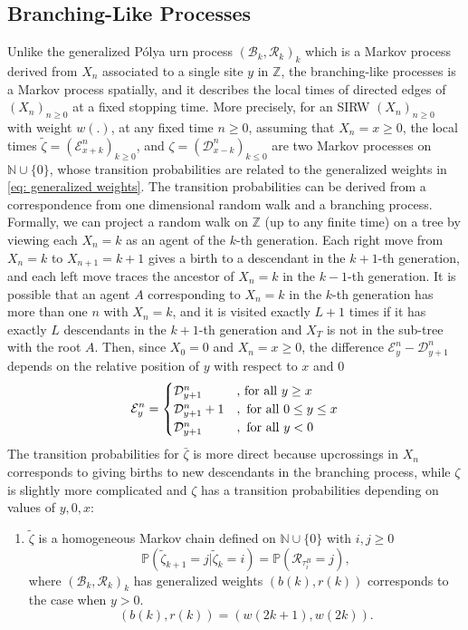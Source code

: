 \documentclass[twoside,12pt,a4paper]{article}
\numberwithin{equation}{section}
\begin{document}
{		\subsection{Branching-Like Processes}
		Unlike the generalized P\'{o}lya urn process $(\mathcal{B}_k,\mathcal{R}_k )_k$ which is a Markov process derived from $X_n$ associated to a single site $y$ in $\mathbb{Z}$, the branching-like processes is a Markov process spatially, and it describes the local times of directed edges of $(X_n)_{n\geq 0}$ at a fixed stopping time. More precisely, for an SIRW $(X_n)_{n\geq 0}$ with weight $w(.)$, at any fixed time $n \geq 0$, assuming that $X_n = x \geq 0 $, the local times $\tilde{\zeta}= (\mathcal{E}^{n}_{x+k} )_{k\geq 0}$, and ${\zeta}= (\mathcal{D}^{n}_{x-k} )_{k\leq 0}$ are two Markov processes on $\mathbb{N}\cup\{0\}$, whose transition probabilities are related to the generalized weights in \eqref{eq: generalized weights}. The transition probabilities can be derived from a correspondence from one dimensional random walk and a branching process. Formally, we can project a random walk on $\mathbb{Z}$ (up to any finite time) on a tree by viewing each $X_n= k$ as an agent of the $k$-th generation. Each right move from $X_n=k$ to $X_{n+1}=k+1$ gives a birth to a descendant in the $k+1$-th generation, and each left move traces the ancestor of $X_n=k$ in the $k-1$-th generation. It is possible that an agent $A$ corresponding to $X_n=k$ in the $k$-th generation has more than one $n$ with $X_n=k$, and it is visited exactly $L+1$ times if it has exactly $L$ descendants in the $k+1$-th generation and $X_T $ is not in the sub-tree with the root $A$. 
		Then, since $X_0=0$ and $X_n =x \geq 0$, the difference $\mathcal{E}^n_y -\mathcal{D}^n_{y+1} $ depends on the relative position of $y$ with respect to $x$ and $0$ 
		\begin{equation}\label{eq: edge values}
			\mathcal{E}^n_y =\begin{cases}
				\mathcal{D}^n_{y+1} &\mbox{, for all $y\geq x$}\\
				\mathcal{D}^n_{y+1} +1 &,\mbox{ for all $0 \leq y\leq x$}
				\\
				\mathcal{D}^n_{y+1} &,\mbox{ for all $ y< 0 $}
			\end{cases}
		\end{equation}
		The transition probabilities for $\bar{\zeta}$ is more direct because upcrossings in $X_n$ corresponds to giving births to new descendants in the branching process, while $\zeta$ is slightly more complicated and $\zeta$ has a transition probabilities depending on values of $y,0,x$: 
		\begin{enumerate}
			\item $\tilde{\zeta}$ is a homogeneous Markov chain defined on  $\mathbb{N}\cup\{0\}$ with $i,j\geq 0$
			\begin{equation}\label{eq: transition prob on positive}
				\mathbb{P}\left(\tilde{\zeta}_{k+1}=j \vert \tilde{\zeta}_k =i  \right) = 
				\mathbb{P}\left( \mathcal{R}_{\tau_i^B} = j \right), 
			\end{equation} where $(\mathcal{B}_k,\mathcal{R}_k )_k$ has generalized weights $(b(k), r(k))$ corresponds to the case when $y>0$.
			$$
			(b(k), r(k)) = (w(2k+1), w(2k)).
			$$
			

\end{enumerate}}
\end{document}
